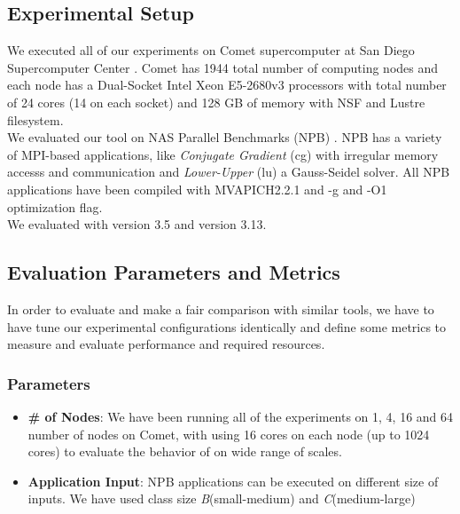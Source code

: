 \subsection{Experimental Setup}
We executed all of our experiments on Comet \cite{comet} supercomputer at San Diego Supercomputer Center . Comet has 1944 total number of computing nodes and each node has a Dual-Socket Intel Xeon E5-2680v3 processors with total number of 24 cores (14 on each socket) and 128 GB of memory with NSF and Lustre filesystem.\\
We evaluated our tool on NAS Parallel Benchmarks (NPB) \cite{nas}. NPB has a variety of MPI-based applications, like \textit{Conjugate Gradient} (cg) with irregular memory accesss and communication and \textit{Lower-Upper} (lu) a Gauss-Seidel solver. All NPB applications have been compiled with MVAPICH2.2.1 and -g and -O1 optimization flag.\\
We evaluated \parlot with \pin version 3.5 and \callgrind version 3.13.

\subsection{Evaluation Parameters and Metrics}
In order to evaluate \parlot and make a fair comparison with similar tools, we have to have tune our experimental configurations identically and define some metrics to measure and evaluate performance and required resources.
\subsubsection{Parameters}
\begin{itemize}
\item \textbf{\# of Nodes}: We have been running all of the experiments on 1, 4, 16 and 64 number of nodes on Comet, with using 16 cores on each node (up to 1024 cores) to evaluate the behavior of \parlot on wide range of scales.
\item \textbf{Application Input}: NPB applications can be executed on different size of inputs. We have used class size \textit{B}(small-medium) and \textit{C}(medium-large)
\end{itemize}

